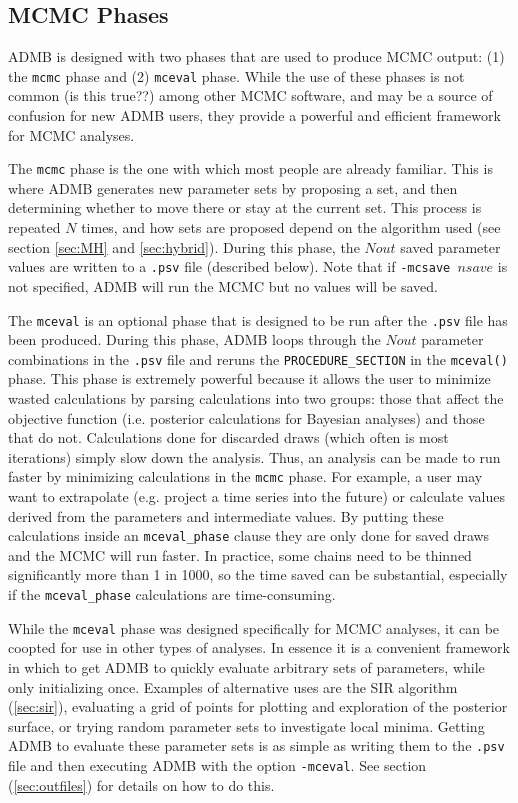 \documentclass{article}\usepackage[]{graphicx}\usepackage[]{color}
\begin{document}
\subsection{MCMC Phases}
ADMB is designed with two phases that are used to produce
MCMC output: (1) the \texttt{mcmc} phase and (2)
\texttt{mceval} phase. While the use of these phases is not
common (is this true??) among other MCMC software, and may
be a source of confusion for new ADMB users, they provide a
powerful and efficient framework for MCMC analyses.

The \texttt{mcmc} phase is the one with which most people
are already familiar. This is where ADMB generates new
parameter sets by proposing a set, and then determining
whether to move there or stay at the current set. This
process is repeated $N$ times, and how sets are proposed
depend on the algorithm used (see section \ref{sec:MH} and
\ref{sec:hybrid}). During this phase, the $Nout$ saved
parameter values are written to a \texttt{.psv} file
(described below). Note that if \texttt{-mcsave $nsave$} is
not specified, ADMB will run the MCMC but no values will be
saved.

The \texttt{mceval} is an optional phase that is designed to
be run after the \texttt{.psv} file has been
produced. During this phase, ADMB loops through the $Nout$
parameter combinations in the \texttt{.psv} file and reruns
the \texttt{PROCEDURE\_SECTION} in the \texttt{mceval()}
phase. This phase is extremely powerful because it allows
the user to minimize wasted calculations by parsing
calculations into two groups: those that affect the
objective function (i.e. posterior calculations for Bayesian
analyses) and those that do not. Calculations done for
discarded draws (which often is most iterations) simply slow
down the analysis. Thus, an analysis can be made to run
faster by minimizing calculations in the \texttt{mcmc}
phase.  For example, a user may want to extrapolate
(e.g. project a time series into the future) or calculate
values derived from the parameters and intermediate
values. By putting these calculations inside an
\texttt{mceval\_phase} clause they are only done for saved
draws and the MCMC will run faster. In practice, some chains
need to be thinned significantly more than 1 in 1000, so the
time saved can be substantial, especially if the
\texttt{mceval\_phase} calculations are time-consuming.

While the \texttt{mceval} phase was designed specifically
for MCMC analyses, it can be coopted for use in other types
of analyses. In essence it is a convenient framework in
which to get ADMB to quickly evaluate arbitrary sets of
parameters, while only initializing once. Examples of
alternative uses are the SIR algorithm (\ref{sec:sir}),
evaluating a grid of points for plotting and exploration of
the posterior surface, or trying random parameter sets to
investigate local minima. Getting ADMB to evaluate these
parameter sets is as simple as writing them to the
\texttt{.psv} file and then executing ADMB with the option
\texttt{-mceval}. See section (\ref{sec:outfiles}) for
details on how to do this.
\end{document}
